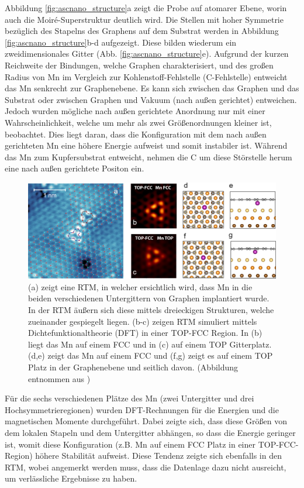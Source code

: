 Abbildung \ref{fig:ascnano_structure}a zeigt die Probe auf atomarer Ebene, worin auch die Moiré-Superstruktur deutlich wird.
Die Stellen mit hoher Symmetrie bezüglich des Stapelns des Graphens auf dem Substrat werden in 
Abbildung \ref{fig:ascnano_structure}b-d aufgezeigt.
Diese bilden wiederum ein zweidimensionales Gitter (Abb. \ref{fig:ascnano_structure}e).
Aufgrund der kurzen Reichweite der Bindungen, welche Graphen charakterisiert, und des großen Radius von Mn im Vergleich zur 
Kohlenstoff-Fehlstelle (C-Fehlstelle) entweicht das Mn senkrecht zur Graphenebene.
Es kann sich zwischen das Graphen und das Substrat oder zwischen Graphen und Vakuum (nach außen gerichtet) entweichen. 
Jedoch wurden mögliche nach außen gerichtete Anordnung nur mit einer Wahrscheinlichkeit, 
welche um mehr als zwei Größenordnungen kleiner ist, beobachtet.
Dies liegt daran, dass die Konfiguration mit dem nach außen gerichteten Mn eine höhere Energie aufweist und somit instabiler ist.
Während das Mn zum Kupfersubstrat entweicht, nehmen die C um diese Störstelle herum eine nach außen gerichtete Positon ein.
\begin{figure}
    \centering
    \includegraphics[width = \textwidth]{Plots/images_large_nn1c00139_0003.jpeg}
    \caption{(a) zeigt eine RTM, in welcher ersichtlich wird, dass Mn in die beiden verschiedenen Untergittern von Graphen implantiert wurde. In der
    RTM äußern sich diese mittels dreieckigen Strukturen, welche zueinander gespiegelt liegen.
    (b-c) zeigen RTM simuliert mittels Dichtefunktionaltheorie (DFT) in einer TOP-FCC Region. In (b) liegt das Mn auf einem FCC
    und in (c) auf einem TOP Gitterplatz. (d,e) zeigt das Mn auf einem FCC und (f,g) zeigt es auf einem TOP Platz in der Graphenebene und seitlich davon.
    (Abbildung entnommen  aus \cite{doi:10.1021/acsnano.1c00139})}
    \label{fig:ascnano_defect}
\end{figure}
Für die sechs verschiedenen Plätze des Mn (zwei Untergitter und drei Hochsymmetrieregionen) wurden DFT-Rechnungen für die Energien und die magnetischen Momente durchgeführt.
Dabei zeigte sich, dass diese Größen von dem lokalen Stapeln und dem Untergitter abhängen, so dass die Energie geringer ist, womit 
diese Konfiguration (z.B. Mn auf einem FCC Platz in einer TOP-FCC-Region) höhere Stabilität aufweist.
Diese Tendenz zeigte sich ebenfalls in den RTM, wobei angemerkt werden muss, dass die Datenlage dazu nicht ausreicht, um
verlässliche Ergebnisse zu haben.  
\newpage
\FloatBarrier
